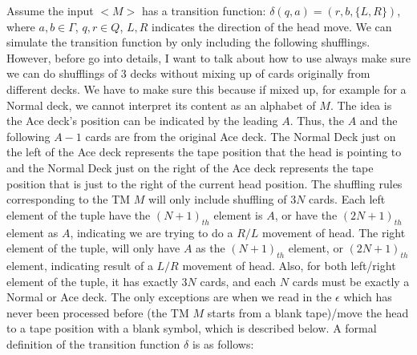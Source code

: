 \documentclass[11pt]{article}
\begin{document}
Assume the input $<M>$ has a transition function: $\delta(q,a) = (r,b,\{L,R\})$, where $a,b \in \Gamma$, $q,r \in Q$, ${L,R}$ indicates the direction of the head move. We can simulate the transition function by only including the following shufflings. However, before go into details, I want to talk about how to use always make sure we can do shufflings of 3 decks without mixing up of cards originally from different decks. We have to make sure this because if mixed up, for example for a Normal deck, we cannot interpret its content as an alphabet of $M$. The idea is the Ace deck's position can be indicated by the leading $A$. Thus, the $A$ and the following $A-1$ cards are from the original Ace deck. The Normal Deck just on the left of the Ace deck represents the tape position that the head is pointing to and the Normal Deck just on the right of the Ace deck represents the tape position that is just to the right of the current head position. The shuffling rules corresponding to the TM $M$ will only include shuffling of $3N$ cards. Each left element of the tuple have the $(N+1)_{th}$ element is $A$, or have the $(2N+1)_{th}$ element as $A$, indicating we are trying to do a $R/L$ movement of head. The right element of the tuple, will only have $A$ as the $(N+1)_{th}$ element, or $(2N+1)_{th}$ element, indicating result of a $L/R$ movement of head. Also, for both left/right element of the tuple, it has exactly $3N$ cards, and each $N$ cards must be exactly a Normal or Ace deck. The only exceptions are when we read in the $\epsilon$ which has never been processed before (the TM $M$ starts from a blank tape)/move the head to a tape position with a blank symbol, which is described below. A formal definition of the transition function $\delta$ is as follows: \\~\\
\end{document}
